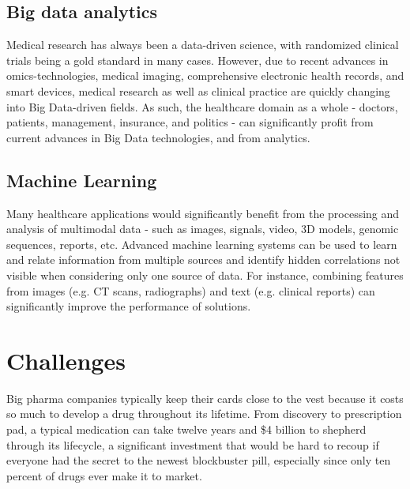 \documentclass[sigconf]{acmart}
\begin{document}
\subsection{Big data analytics}
Medical research has always been a data-driven science, with 
randomized clinical trials being a gold standard in many cases. 
However, due to recent advances in omics-technologies, medical 
imaging, comprehensive electronic health records, and smart devices,
medical research as well as clinical practice are quickly changing 
into Big Data-driven fields. As such, the healthcare domain as a 
whole - doctors, patients, management, insurance, and politics -
can significantly profit from current advances in Big Data 
technologies, and from analytics\cite{TR04}.
\subsection{Machine Learning}
Many healthcare applications would significantly benefit from the
processing and analysis of multimodal data - such as images, 
signals, video, 3D models, genomic sequences, reports, etc. 
Advanced machine learning systems can be used to learn and relate
information from multiple sources and identify hidden correlations 
not visible when considering only one source of data. For instance,
combining features from images (e.g. CT scans, radiographs) and text
(e.g. clinical reports) can significantly improve the performance 
of solutions\cite{TR04}.

\section{Challenges}
Big pharma companies typically keep their cards close to the vest 
because it costs so much to develop a drug throughout its lifetime.
From discovery to prescription pad, a typical medication can take 
twelve years and \$4 billion to shepherd through its lifecycle, a
significant investment that would be hard to recoup if everyone had
the secret to the newest blockbuster pill, especially since only ten
percent of drugs ever make it to market\cite{TR06}.
\end{document}
